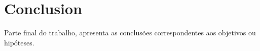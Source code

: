 \chapter{Conclusion}

Parte final do trabalho, apresenta as conclusões correspondentes aos objetivos
ou hipóteses.